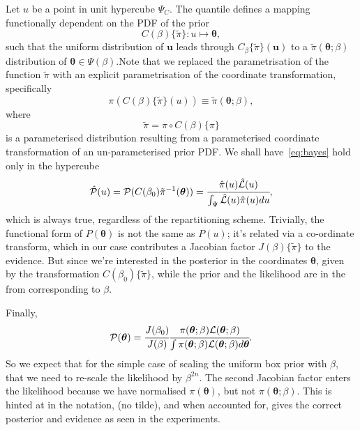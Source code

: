 \documentclass[usenatbib]{mnras}
\begin{document}
Let \(u\) be a point in unit hypercube \(\Psi_{C}\). The quantile
defines a mapping functionally dependent on the PDF of the prior
\[C(\beta)\lbrace \tilde{\pi}\rbrace:u \mapsto \bm{\theta},\] such that
the uniform distribution of \(\bm{u}\) leads through
\(C_{\beta}\{\tilde{\pi}\}(\bm{u})\) to a \(\tilde{\pi}(\bm{\theta};\beta)\)
distribution of \(\bm{\theta} \in\Psi(\beta)\).Note that we replaced the
parametrisation of the function \(\tilde{\pi}\) with an explicit
parametrisation of the coordinate transformation, specifically
\begin{equation*}
  \pi(C(\beta)\{\tilde{\pi}\}(u)) \equiv \tilde{\pi}(\bm{\theta}; \beta),
\end{equation*}
where 
\begin{equation*}
  \tilde{\pi} =  \pi \circ C(\beta) \{ \pi \} 
\end{equation*}
is a parameterised distribution resulting from a parameterised
coordinate transformation of an un-parameterised prior PDF. We shall
have~\vref{eq:bayes} hold only in the hypercube
\begin{equation*}
{\cal \hat{P}}(u) = {\cal P}(C(\beta_{0}){\tilde{\pi}}^{-1}(\bm{\theta})) = \cfrac{\hat{\pi} (u) {\cal \hat{L}}(u)}{\int_{\Psi}{\cal \hat{L}}(u) \hat{\pi}(u) du},
\end{equation*}
which is always true, regardless of the repartitioning
scheme. Trivially, the functional form of \(P(\bm{\theta})\) is not the same
as \(P(u)\); it's related via a co-ordinate transform, which in our
case contributes a Jacobian factor \(J(\beta)\{\tilde{\pi}\}\) to the
evidence. But since we're interested in the posterior in the
coordinates \(\bm{\theta}\), given by the transformation \(C(\beta_{0})\{\tilde{\pi}\}\),
while the prior and the likelihood are in the from corresponding
to \(\beta\).

Finally, 
\begin{equation*}
 {\cal P}(\bm{\theta}) = \cfrac{J(\beta_{0})}{J(\beta)} \cfrac{\pi(\bm{\theta}; \beta) {\cal L}(\bm{\theta}; \beta)}{\int \pi(\bm{\theta}; \beta) {\cal L}(\bm{\theta}; \beta) d \bm{\theta}}.
\end{equation*}
So we expect that for the simple case of scaling the uniform box
prior with \(\beta\), that we need to re-scale the likelihood by
\(\beta^{2n}\). The second Jacobian factor enters the likelihood because
we have normalised \(\pi(\bm{\theta})\), but not \(\pi(\bm{\theta}; \beta)\). This is hinted at in
the notation, (no tilde), and when accounted for, gives  the correct
posterior and evidence as seen in the experiments.
\end{document}
